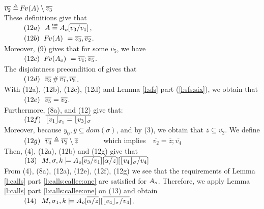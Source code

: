\begin{description}
$\overline {v_2} \triangleq  \fv(A)\setminus \overline {v_3}$ %
\\
These definitions give that
\\
$\SPS (12a) \ \  A \txteq \Ao[\overline {v_3/v_1}]$,
\\ 
$\SPS (12b)  \ \  \fv(A)\ =\overline {v_3}, \overline {v_2}$.
\\
Moreover, (9) gives that for some $\overline {v_5}$, we have \\
$\SPS (12c)  \ \  \fv(\Ao)\ =\overline{v_1}; \overline {v_5}$.
\\
The disjointness precondition of {} gives that\\
$\SPS (12d)  \ \  \overline {v_3}\, \#\, \overline {v_1}, \overline {v_5}$.
\\
With (12a), (12b), (12c), (12d)  and Lemma \ref{l:sfs}  part (\ref{l:sfs:six}), we obtain that \\ 
$\SPS (12e)\ \    \overline {v_5} =   \overline{v_2} $.
\\
Furthermore, (8a), and (12) give that:\\
$\SPS (12f) \ \  \overline { {\interpret {\sigma_1} {v_1}} = {\interpret {\sigma} {v_3}} }$
\\
Moreover, because $y_0,\overline y \subseteq dom(\sigma)$, and by (3), we obtain that $\overline z \subseteq \overline {v_2}$. We define\\
$\SPS (12g) \ \ \overline {v_4} \triangleq  \overline {v_2}\setminus \overline {z}$\ \ \ \ \ \ \ which implies\ \ $ \overline {v_2} = \overline z; \overline{v_4}$
\\
Then, (4),  (12a),   (12b) and (12g) give that\\
$\SPS (13) \ \ \satDAssertFrom M  {\sigma} {k}   {\Ao[\overline{v_3/v_1}][\overline{\alpha/z}][\overline{\interpret{\sigma}{v_4}/v_4}]}$
\\
From (4), (8a), (12a), (12e), (12f), (12g)  we see that the requirements  %
 of Lemma \ref{l:calls}  part  \ref{l:calls:callee:one} are satisfied for $\Ao$.
  Therefore, we apply   Lemma   \ref{l:calls} part \ref{l:calls:callee:one} on (13) and  obtain\\
$\SPS (14) \ \  \satDAssertFrom M  {\sigma_1} {k}   {\Ao[\overline{\alpha/z}][\overline{\interpret{\sigma}{v_4}/v_4}] }$. \\


\end{description}
